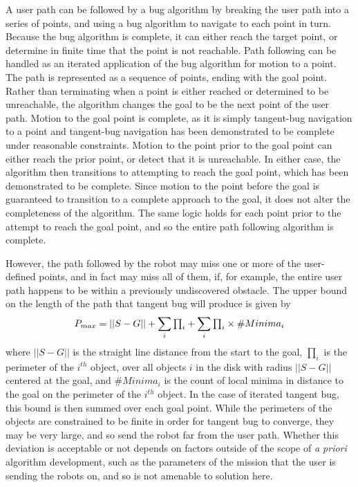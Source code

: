 A user path can be followed by a bug algorithm by breaking the user path into a series of points, and using a bug algorithm to navigate to each point in turn. 
Because the bug algorithm is complete, it can either reach the target point, or determine in finite time that the point is not reachable. 
Path following can be handled as an iterated application of the bug algorithm for motion to a point.
The path is represented as a sequence of points, ending with the goal point.
Rather than terminating when a point is either reached or determined to be unreachable, the algorithm changes the goal to be the next point of the user path. 
Motion to the goal point is complete, as it is simply tangent-bug navigation to a point and tangent-bug navigation has been demonstrated to be complete under reasonable constraints. 
Motion to the point prior to the goal point can either reach the prior point, or detect that it is unreachable. 
In either case, the algorithm then transitions to attempting to reach the goal point, which has been demonstrated to be complete.
Since motion to the point before the goal is guaranteed to transition to a complete approach to the goal, it does not alter the completeness of the algorithm. 
The same logic holds for each point prior to the attempt to reach the goal point, and so the entire path following algorithm is complete.  

However, the path followed by the robot may miss one or more of the user-defined points, and in fact may miss all of them, if, for example, the entire user path happens to be within a previously undiscovered obstacle.  
The upper bound on the length of the path that tangent bug will produce is given by 
\[P_{max} = ||S-G|| + \sum_{i}\mathsmaller{\prod_i} + \sum_{i}\mathsmaller{\prod_i} \times \#Minima_i \]
where $||S-G||$ is the straight line distance from the start to the goal, $\prod_i$ is the perimeter of the $i^{th}$ object, over all objects $i$ in the disk with radius $||S-G||$ centered at the goal, and $\#Minima_i$ is the count of local minima in distance to the goal on the perimeter of the $i^{th}$ object. 
In the case of iterated tangent bug, this bound is then summed over each goal point. 
While the perimeters of the objects are constrained to be finite in order for tangent bug to converge, they may be very large, and so send the robot far from the user path. 
Whether this deviation is acceptable or not depends on factors outside of the scope of \emph{a priori} algorithm development, such as the parameters of the mission that the user is sending the robots on, and so is not amenable to solution here. 

